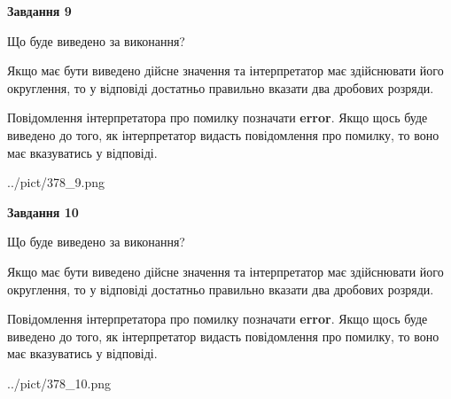 \documentclass[12pt, ukrainian]{article}
\begin{document}
{\begin {Large}
{\begin {center}\textbf{Завдання 9}\end {center}}\par
Що буде виведено за виконання? \par

Якщо має бути виведено дійсне значення та інтерпретатор має здійснювати його округлення, 
то у відповіді достатньо правильно вказати два дробових розряди.

Повідомлення інтерпретатора про помилку позначати \textbf{error}.
Якщо щось буде виведено до того, як інтерпретатор видасть повідомлення про помилку, 
то воно має вказуватись у відповіді. \par

\begin{center}
	{../pict/378_9.png}
\end{center}
\newpage

{\begin {center}\textbf{Завдання 10}\end {center}}\par
Що буде виведено за виконання? \par

Якщо має бути виведено дійсне значення та інтерпретатор має здійснювати його округлення, 
то у відповіді достатньо правильно вказати два дробових розряди.

Повідомлення інтерпретатора про помилку позначати \textbf{error}.
Якщо щось буде виведено до того, як інтерпретатор видасть повідомлення про помилку, 
то воно має вказуватись у відповіді. \par

\begin{center}
	{../pict/378_10.png}
\end{center}
\newpage

\end {Large}}
\end{document}
